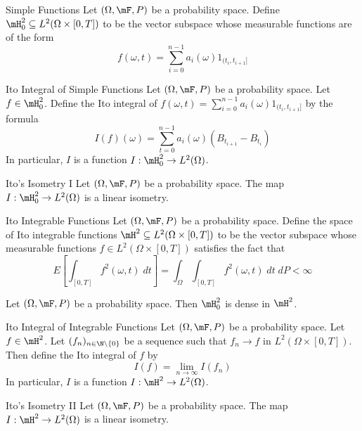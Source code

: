 \documentclass[a4paper]{article}
\begin{document}
\begin{defn}{Simple Functions}{} Let $(\Omega,\mF,P)$ be a probability space. Define $\mH_0^2\subseteq L^2(\Omega\times[0,T])$ to be the vector subspace whose measurable functions are of the form $$f(\omega,t)=\sum_{i=0}^{n-1}a_i(\omega)1_{(t_i,t_{i+1}]}$$
\end{defn}

\begin{defn}{Ito Integral of Simple Functions}{} Let $(\Omega,\mF,P)$ be a probability space. Let $f\in\mH_0^2$. Define the Ito integral of $f(\omega,t)=\sum_{i=0}^{n-1}a_i(\omega)1_{(t_i,t_{i+1}]}$ by the formula $$I(f)(\omega)=\sum_{t=0}^{n-1}a_i(\omega)(B_{t_{i+1}}-B_{t_i})$$ In particular, $I$ is a function $I:\mH_0^2\to L^2(\Omega)$. 
\end{defn}

\begin{lmm}{Ito's Isometry I}{} Let $(\Omega,\mF,P)$ be a probability space. The map $I:\mH_0^2\to L^2(\Omega)$ is a linear isometry. 
\end{lmm}

\begin{defn}{Ito Integrable Functions}{} Let $(\Omega,\mF,P)$ be a probability space. Define the space of Ito integrable functions $\mH^2\subseteq L^2(\Omega\times[0,T])$ to be the vector subspace whose measurable functions $f\in L^2(\Omega\times[0,T])$ satisfies the fact that $$E\left[\int_{[0,T]}f^2(\omega,t)\;dt\right]=\int_\Omega\int_{[0,T]}f^2(\omega,t)\;dt\;dP<\infty$$
\end{defn}

\begin{lmm}{}{} Let $(\Omega,\mF,P)$ be a probability space. Then $\mH_0^2$ is dense in $\mH^2$. 
\end{lmm}

\begin{defn}{Ito Integral of Integrable Functions}{} Let $(\Omega,\mF,P)$ be a probability space. Let $f\in\mH^2$. Let $(f_n)_{n\in\N\setminus\{0\}}$ be a sequence such that $f_n\to f$ in $L^2(\Omega\times[0,T])$. Then define the Ito integral of $f$ by $$I(f)=\lim_{n\to\infty}I(f_n)$$ In particular, $I$ is a function $I:\mH^2\to L^2(\Omega)$. 
\end{defn}

\begin{lmm}{Ito's Isometry II}{} Let $(\Omega,\mF,P)$ be a probability space. The map $I:\mH^2\to L^2(\Omega)$ is a linear isometry. 
\end{lmm}
\end{document}
